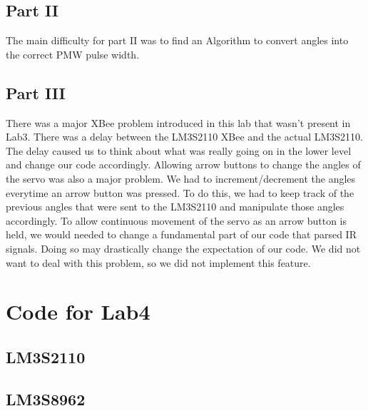 \documentclass[11pt, titlepage]{article}
\begin{document}
        \subsection{Part II}
            The main difficulty for part II was to find an Algorithm to convert angles into the correct PMW pulse width.
        \subsection{Part III}
            There was a major XBee problem introduced in this lab that wasn't present in Lab3. There was a delay between the LM3S2110 XBee and the actual LM3S2110. The delay caused us to think about what was really going on in the lower level and change our code accordingly. Allowing arrow buttons to change the angles of the servo was also a major problem. We had to increment/decrement the angles everytime an arrow button was pressed. To do this, we had to keep track of the previous angles that were sent to the LM3S2110 and manipulate those angles accordingly. To allow continuous movement of the servo as an arrow button is held, we would needed to change a fundamental part of our code that parsed IR signals. Doing so may drastically change the expectation of our code. We did not want to deal with this problem, so we did not implement this feature.

    
    \newpage
    \appendix
    \section{Code for Lab4}
        \subsection{LM3S2110}
            
        
        \newpage
        \subsection{LM3S8962}
            
\end{document}
